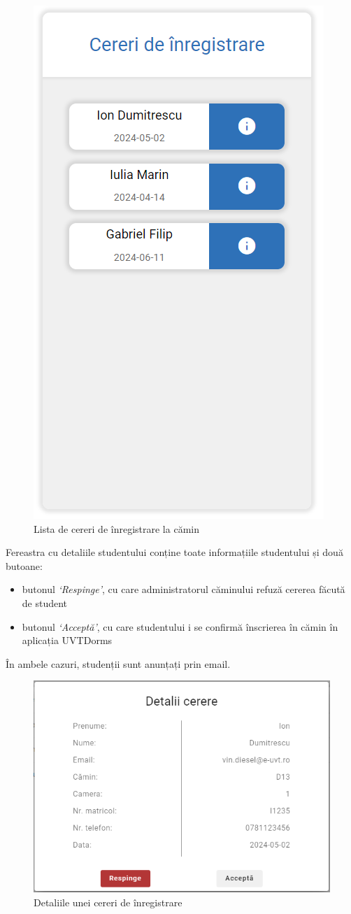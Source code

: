 \documentclass[12pt,a4paper]{report}
\theoremstyle{definition}
\theoremstyle{remark}
\begin{document}
\begin{figure}[H]
    \centering
    \includegraphics[width=0.3\linewidth]{resurse/ghid_utilizare/cereri_inscriere.png}
    \caption{Lista de cereri de înregistrare la cămin}
\end{figure}

\par Fereastra cu detaliile studentului conține toate informațiile studentului și două butoane:

\begin{itemize}
    \item butonul \textit{`Respinge'}, cu care administratorul căminului refuză cererea făcută de student
    \item butonul \textit{`Acceptă'}, cu care studentului i se confirmă înscrierea în cămin în \textnormal{ap\-li\-ca\-ți\-a} UVTDorms
\end{itemize}

\par În ambele cazuri, studenții sunt anunțați prin email.

\begin{figure}[H]
    \centering
    \includegraphics[width=0.8\linewidth]{resurse/ghid_utilizare/detalii_cererre_inscriere.png}
    \caption{Detaliile unei cereri de înregistrare}
\end{figure}
\end{document}
